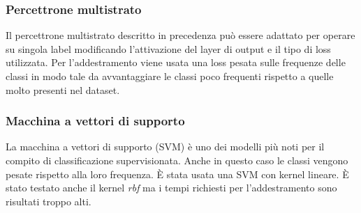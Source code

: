 \documentclass[technote]{IEEEtran}
\begin{document}
\subsubsection{Percettrone multistrato}
Il percettrone multistrato descritto in precedenza può essere
adattato per operare su singola label modificando l'attivazione
del layer di output e il tipo di loss utilizzata.
Per l'addestramento viene usata una loss pesata sulle frequenze
delle classi in modo tale da avvantaggiare le classi poco
frequenti rispetto a quelle molto presenti nel dataset.
\subsubsection{Macchina a vettori di supporto}
La macchina a vettori di supporto (SVM) è uno dei modelli più noti
per il compito di classificazione supervisionata. Anche in questo caso le classi
vengono pesate rispetto alla loro frequenza.
\`E stata usata una SVM con kernel lineare. \`E stato testato anche il
kernel \textit{rbf} ma i tempi richiesti per l'addestramento sono risultati
troppo alti.
\end{document}
